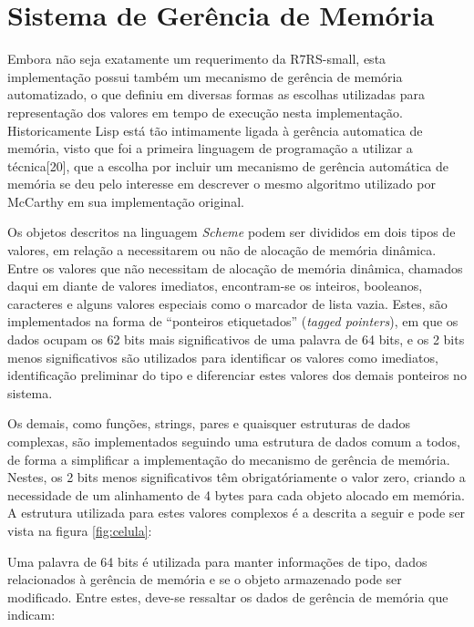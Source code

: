\section{Sistema de Gerência de Memória}
\label{sec:memoria}

Embora não seja exatamente um requerimento da \acs{R7RS}-small, esta implementação
possui também um mecanismo de gerência de memória automatizado, o que definiu
em diversas formas as escolhas utilizadas para representação dos valores em
tempo de execução nesta implementação. Historicamente Lisp está tão
intimamente ligada à gerência automatica de memória, visto que foi a primeira
linguagem de programação a utilizar a técnica[20], que a escolha por incluir um
mecanismo de gerência automática de memória se deu pelo interesse em descrever
o mesmo algoritmo utilizado por McCarthy em sua implementação original.

Os objetos descritos na linguagem \textit{Scheme} podem ser divididos em dois
tipos de valores, em relação a necessitarem ou não de alocação de memória
dinâmica. Entre os valores que não necessitam de alocação de memória dinâmica,
chamados daqui em diante de valores imediatos, encontram-se os inteiros,
booleanos, caracteres e alguns valores especiais como o marcador de lista
vazia. Estes, são implementados na forma de ``ponteiros etiquetados''
(\textit{tagged pointers}), em que os dados ocupam os 62 bits mais
significativos de uma palavra de 64 bits, e os 2 bits menos significativos são
utilizados para identificar os valores como imediatos, identificação preliminar
do tipo e diferenciar estes valores dos demais ponteiros no sistema.

Os demais, como funções, strings, pares e quaisquer estruturas de dados
complexas, são implementados seguindo uma estrutura de dados comum a todos, de
forma a simplificar a implementação do mecanismo de gerência de memória.
Nestes, os 2 bits menos significativos têm obrigatóriamente o valor zero,
criando a necessidade de um alinhamento de 4 bytes para cada objeto alocado em
memória. A estrutura utilizada para estes valores complexos é a descrita a
seguir e pode ser vista na figura \ref{fig:celula}:

Uma palavra de 64 bits é utilizada para manter informações de tipo, dados
relacionados à gerência de memória e se o objeto armazenado pode ser
modificado. Entre estes, deve-se ressaltar os dados de gerência de memória que
indicam:

